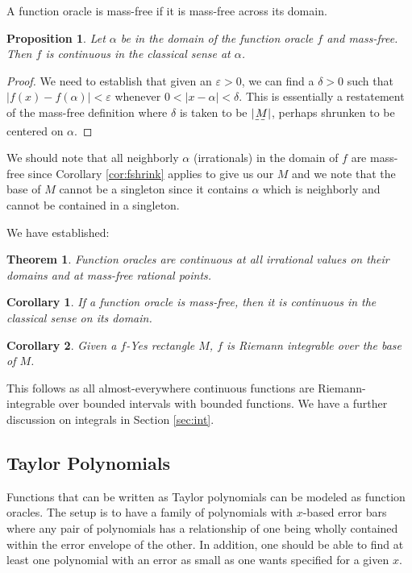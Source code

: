 \documentclass[12pt]{article}
\newtheorem{theorem}{Theorem}[subsection]
\newtheorem{corollary}{Corollary}[subsection]
\newtheorem{proposition}{Proposition}[subsection]
\theoremstyle{remark}
\begin{document}
 A function oracle is mass-free if it is mass-free across its domain.  

\begin{proposition}
Let $\alpha$ be in the domain of the function oracle $f$ and mass-free. Then $f$ is continuous in the classical sense at $\alpha$.
\end{proposition}

\begin{proof}
    We need to establish that given an $\varepsilon > 0$, we can find a $\delta > 0$ such that $|f(x) - f(\alpha)| < \varepsilon$ whenever $0 < |x - \alpha| < \delta$. This is essentially a restatement of the mass-free definition where $\delta$ is taken to be $|\base{M}|$, perhaps shrunken to be centered on $\alpha$. 
\end{proof}

We should note that all neighborly $\alpha$ (irrationals) in the domain of $f$ are mass-free since Corollary \ref{cor:fshrink} applies to give us our $M$ and we note that the base of $M$ cannot be a singleton since it contains $\alpha$ which is neighborly and cannot be contained in a singleton.

We have established:

\begin{theorem}
    Function oracles are continuous at all irrational values on their domains and at mass-free rational points. 
\end{theorem}

\begin{corollary}
If a function oracle is mass-free, then it is continuous in the classical sense on its domain. 
\end{corollary}

\begin{corollary}
Given a $f$-Yes rectangle $M$, $f$ is Riemann integrable over the base of $M$. 
\end{corollary}

This follows as all almost-everywhere continuous functions are Riemann-integrable over bounded intervals with bounded functions. We have a further  discussion on integrals in Section \ref{sec:int}.


\subsection{Taylor Polynomials}

Functions that can be written as Taylor polynomials can be modeled as function oracles. The setup is to have a family of polynomials with $x$-based error bars where any pair of polynomials has a relationship of one being wholly contained within the error envelope of the other. In addition, one should be able to find at least one polynomial with an error as small as one wants specified for a given $x$. 
\end{document}
